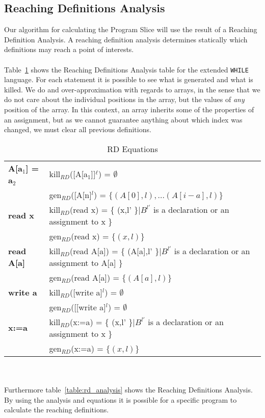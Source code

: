 \subsection{Reaching Definitions Analysis}
Our algorithm for calculating the Program Slice will use the result of a Reaching Definition Analysis. A reaching definition analysis determines statically which definitions may reach a point of interests.
\\\\
Table~\ref{table:rd_equations} shows the Reaching Definitions Analysis table for the extended \texttt{WHILE} language. For each statement it is possible to see what is generated and what is killed. We do and over-approximation with regards to arrays, in the sense that we do not care about the individual positions in the array, but the values of \emph{any} position of the array. In this context, an array inherits some of the properties of an assignment, but as we cannot guarantee anything about which index was changed, we must clear all previous definitions.
\begin{table}[h]
    \begin{tabular}{l | l }
    \textbf{A[a$_1$] = a$_2$} & kill$_{RD}$([A[a$_1$]]$^\ell$) = $\emptyset$ \\
                              & gen$_{RD}$([A[n]$^l$) = $\{(A[0],l), ... (A[i-a],l)\}$ \\

    \hline
    \textbf{read x} & kill$_{RD}$(read x) = \{ (x,l' \}|$B^{l'}$ is a declaration or an assignment to x \} \\
                              & gen$_{RD}$(read x) = $\{(x,l)\}$ \\
							  
    \hline
    \textbf{read A[a]} & kill$_{RD}$(read A[a]) = \{ (A[a],l' \}|$B^{l'}$ is a declaration or an assignment to A[a] \} \\
                              & gen$_{RD}$(read A[a]) = $\{(A[a],l)\}$ \\
							  
    \hline
    \textbf{write a} &  kill$_{RD}$([write a]$^l$) = $\emptyset$ \\
                   &  gen$_{RD}$([[write a]$^l$) = $\emptyset$ \\

    \hline
    \textbf{x:=a} & kill$_{RD}$(x:=a) = \{ (x,l' \}|$B^{l'}$ is a declaration or an assignment to x \} \\
                              & gen$_{RD}$(x:=a) = $\{(x,l)\}$ \\
    \end{tabular}
    \centering
	\caption{RD Equations}
	\label{table:rd_equations}
\end{table}
\\\\
Furthermore table~\ref{table:rd_analysis} shows the Reaching Definitions Analysis. By using the analysis and equations it is possible for a specific program to calculate the reaching definitions.

